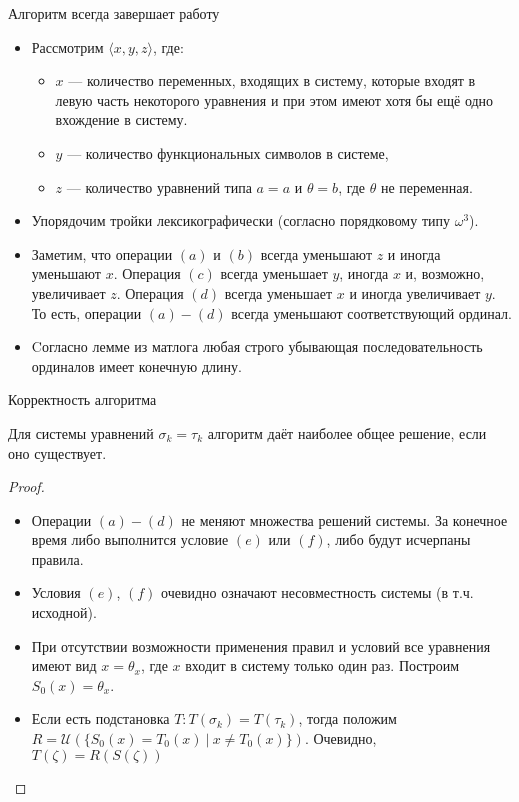 \documentclass[aspectratio=169]{beamer}
\begin{document}
\begin{frame}{Алгоритм всегда завершает работу}
\begin{itemize}
\item Рассмотрим $\langle x,y,z \rangle$,
где:
\begin{itemize}\item $x$ --- количество переменных, входящих в систему, которые входят в левую часть
некоторого уравнения и при этом имеют хотя бы ещё одно вхождение в систему.
\item $y$ --- количество функциональных символов в системе,
\item $z$ --- количество уравнений типа $a=a$ и $\theta=b$, где $\theta$ не переменная.
\end{itemize}
\item Упорядочим тройки лексикографически (согласно порядковому типу $\omega^3$).

\item Заметим, что операции $(a)$ и $(b)$ всегда уменьшают $z$ и иногда уменьшают $x$.
Операция $(c)$ всегда уменьшает $y$, иногда $x$ и, возможно, увеличивает $z$.
Операция $(d)$ всегда уменьшает $x$ и иногда увеличивает $y$. То есть, операции $(a)-(d)$ всегда уменьшают
соответствующий ординал.

\item Cогласно лемме из матлога любая строго убывающая последовательность ординалов имеет конечную длину.
\end{itemize}
\end{frame}

\begin{frame}{Корректность алгоритма}
\begin{thm}Для системы уравнений $\sigma_k = \tau_k$ алгоритм даёт наиболее общее решение, если оно существует.\end{thm}
\begin{proof}
\begin{itemize}
\item Операции $(a)-(d)$ не меняют множества решений системы. За конечное время либо выполнится условие $(e)$ или $(f)$,
либо будут исчерпаны правила.
\item Условия $(e)$, $(f)$ очевидно означают несовместность системы (в т.ч. исходной).
\item При отсутствии возможности применения правил и условий все уравнения имеют вид $x = \theta_x$,
где $x$ входит в систему только один раз. Построим $S_0(x) = \theta_x$. 

\item Если есть подстановка $T: T(\sigma_k) = T(\tau_k)$, тогда положим $R = \mathcal{U}(\{ S_0(x) = T_0(x)\ |\ x \ne T_0(x)\})$.
Очевидно, $T(\zeta) = R(S(\zeta))$
\end{itemize}
\end{proof}
\end{frame}
\end{document}
